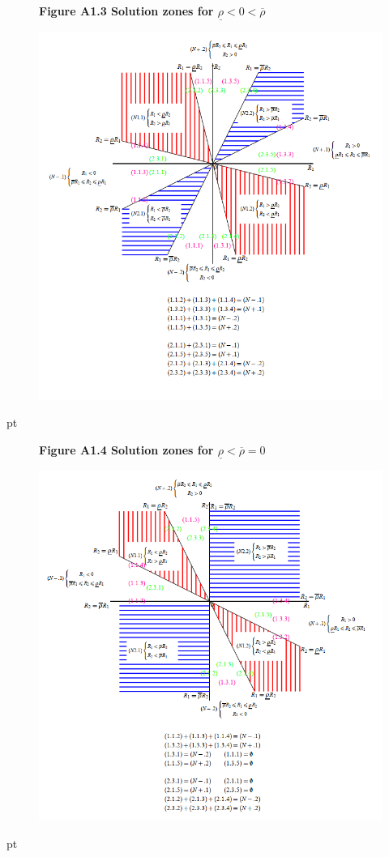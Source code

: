 \documentclass[10.0pt]{article}
\begin{document}
\begin{figure}
\centerline{\bf Figure A1.3 \quad Solution zones for $ \underline{\rho} < 0 < \overline{\rho} $}
	\centering
	\includegraphics[width=1.1 \textwidth]{FigureA1.3.png}
\end{figure}
 pt



\newpage


\begin{figure}
\centerline{\bf Figure A1.4 \quad Solution zones for $ \underline{\rho} < \overline{\rho} = 0 $}
	\centering
	\includegraphics[width=1.1 \textwidth]{FigureA1.4.png}
\end{figure}
 pt
\end{document}
